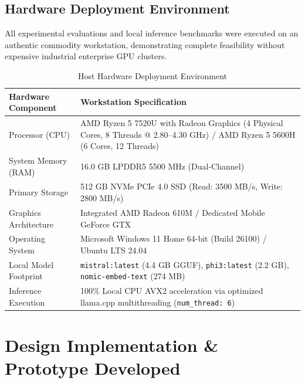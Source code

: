 \documentclass[12pt,a4paper]{report}
\begin{document}
\section{Hardware Deployment Environment}

All experimental evaluations and local inference benchmarks were executed on an authentic commodity workstation, demonstrating complete feasibility without expensive industrial enterprise GPU clusters.

\begin{table}[H]
\centering
\caption{Host Hardware Deployment Environment}
\label{tab:hardware}
\begin{tabularx}{\textwidth}{P{0.28\textwidth} Y}
\toprule
\textbf{Hardware Component} & \textbf{Workstation Specification}\\
\midrule

Processor (CPU) &
AMD Ryzen 5 7520U with Radeon Graphics (4 Physical Cores, 8 Threads @ 2.80--4.30 GHz) / AMD Ryzen 5 5600H (6 Cores, 12 Threads)
\\

System Memory (RAM) &
16.0 GB LPDDR5 5500 MHz (Dual-Channel)
\\

Primary Storage &
512 GB NVMe PCIe 4.0 SSD (Read: 3500 MB/s, Write: 2800 MB/s)
\\

Graphics Architecture &
Integrated AMD Radeon 610M / Dedicated Mobile GeForce GTX
\\

Operating System &
Microsoft Windows 11 Home 64-bit (Build 26100) / Ubuntu LTS 24.04
\\

Local Model Footprint &
\texttt{mistral:latest} (4.4 GB GGUF), \texttt{phi3:latest} (2.2 GB), \texttt{nomic-embed-text} (274 MB)
\\

Inference Execution &
100\% Local CPU AVX2 acceleration via optimized llama.cpp multithreading (\texttt{num\_thread: 6})
\\

\bottomrule
\end{tabularx}
\end{table}


\chapter{Design Implementation \& Prototype Developed}
\end{document}
